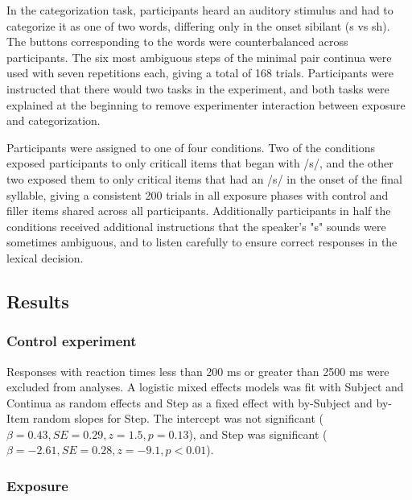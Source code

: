 In the categorization task, participants heard an auditory stimulus and had to categorize it as one of two words, differing only in the onset sibilant (s vs sh).  
The buttons corresponding to the words were counterbalanced across participants.  
The six most ambiguous steps of the minimal pair continua were used with seven repetitions each, giving a total of 168 trials.
Participants were instructed that there would two tasks in the experiment, and both tasks were explained at the beginning to remove experimenter interaction between exposure and categorization.  

Participants were assigned to one of four conditions. 
Two of the conditions exposed participants to only criticall items that began with /s/, and the other two exposed them to only critical items that had an /s/ in the onset of the final syllable, giving a consistent 200 trials in all exposure phases with control and filler items shared across all participants. 
Additionally participants in half the conditions received additional instructions that the speaker's "s" sounds were sometimes ambiguous, and to listen carefully to ensure correct responses in the lexical decision.

\subsection{Results}

\subsubsection{Control experiment}

Responses with reaction times less than 200 ms or greater than 2500 ms were excluded from analyses. 
A logistic mixed effects models was fit with Subject and Continua as random effects and Step as a fixed effect with by-Subject and by-Item random slopes for Step. 
The intercept was not significant ($\beta = 0.43, SE = 0.29, z = 1.5, p = 0.13$), and Step was significant ($\beta = -2.61, SE = 0.28, z = -9.1, p < 0.01$).

\subsubsection{Exposure}

